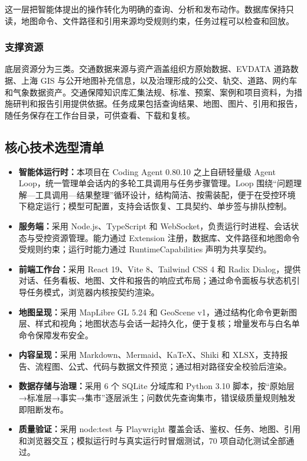 \documentclass[a4paper,11pt]{article}
\newcommand{\term}[1]{\textbf{#1}}
\begin{document}
这一层把智能体提出的操作转化为明确的查询、分析和发布动作。数据库保持只读，地图命令、文件路径和引用来源均受规则约束，任务过程可以检查和回放。

\subsubsection{支撑资源}

底层资源分为三类。交通数据来源与资产涵盖组织方原始数据、EVDATA 道路数据、上海 GIS 与公开地图补充信息，以及治理形成的公交、轨交、道路、网约车和气象数据资产。交通保障知识库汇集法规、标准、预案、案例和项目资料，为措施研判和报告引用提供依据。任务成果包括查询结果、地图、图片、引用和报告，随任务保存在工作台目录，可供查看、下载和复核。

\subsection{核心技术选型清单}

\begin{itemize}
  \item \term{智能体运行时：}本项目在 Coding Agent 0.80.10 之上自研轻量级 Agent Loop，统一管理单会话内的多轮工具调用与任务步骤管理。Loop 围绕“问题理解—工具调用—结果整理”循环设计，结构简洁、按需装配，便于在受控环境下稳定运行；模型可配置，支持会话恢复、工具契约、单步签与排队控制。
  \item \term{服务端：}采用 Node.js、TypeScript 和 WebSocket，负责运行时进程、会话状态与受控资源管理。能力通过 Extension 注册，数据库、文件路径和地图命令受规则约束；运行时能力通过 RuntimeCapabilities 声明为共享契约。
  \item \term{前端工作台：}采用 React 19、Vite 8、Tailwind CSS 4 和 Radix Dialog，提供对话、任务看板、地图、文件和报告的响应式布局；通过命令面板与状态机引导任务模式，浏览器内核按契约渲染。
  \item \term{地图呈现：}采用 MapLibre GL 5.24 和 GeoScene v1，通过结构化命令更新图层、样式和视角；地图状态与会话一起持久化，便于复核；增量发布与白名单命令保障发布安全。
  \item \term{内容呈现：}采用 Markdown、Mermaid、KaTeX、Shiki 和 XLSX，支持报告、流程图、公式、代码与数据文件预览；通过相对路径安全校验后渲染。
  \item \term{数据存储与治理：}采用 6 个 SQLite 分域库和 Python 3.10 脚本，按“原始层→标准层→事实→集市”逐层派生；问数优先查询集市，错误级质量规则触发即阻断发布。
  \item \term{质量验证：}采用 node:test 与 Playwright 覆盖会话、鉴权、任务、地图、引用和浏览器交互；模拟运行时与真实运行时冒烟测试，70 项自动化测试全部通过。
\end{itemize}
\end{document}
